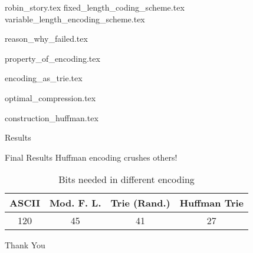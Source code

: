 \documentclass[14pt,xcolor=table]{beamer}
\begin{document}
\frame{\titlepage}
{robin_story.tex}
{fixed_length_coding_scheme.tex}
{variable_length_encoding_scheme.tex}

{reason_why_failed.tex}

{property_of_encoding.tex}

{encoding_as_trie.tex}

{optimal_compression.tex}

{construction_huffman.tex}

\begin{frame}{Results}

\begin{block}{\centering Final Results}
\centering 
    Huffman encoding crushes others!
\end{block}
\begin{table}[]
    \centering
    \begin{tabular}{|c|c|c|c|}
    \hline
        ASCII  & Mod. F. L. & Trie (Rand.) & Huffman Trie \\\hline
         120 & 45 & 41 & 27 \\ \hline 
    \end{tabular}
    \caption{Bits needed in different encoding}
\end{table}    
\end{frame}
\begin{frame}
\begin{center}
    \Huge{Thank You}
\end{center}

\end{frame} 
\end{document}
